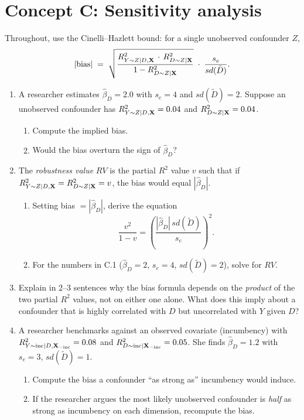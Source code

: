 \documentclass{article}
\begin{document}
\bigskip

\section*{Concept C: Sensitivity analysis}

Throughout, use the Cinelli--Hazlett bound: for a single unobserved confounder $Z$,
$$|\text{bias}| \;=\; \sqrt{\frac{R^2_{Y\sim Z\mid D,{\mathbf X}}\,\cdot\, R^2_{D\sim Z\mid {\mathbf X}}}{1 - R^2_{D\sim Z\mid {\mathbf X}}}}\;\cdot\;\frac{s_e}{sd(\tilde D)}.$$

\begin{enumerate}[label=\textbf{C.\arabic*},leftmargin=*,itemsep=10pt]

\item  A researcher estimates $\hat\beta_D = 2.0$ with $s_e = 4$ and $sd(\tilde D) = 2$.  Suppose an unobserved confounder has $R^2_{Y\sim Z\mid D,{\mathbf X}} = 0.04$ and $R^2_{D\sim Z\mid {\mathbf X}} = 0.04$.
\begin{enumerate}[label=(\alph*)]
  \item Compute the implied bias.
  \item Would the bias overturn the sign of $\hat\beta_D$?
\end{enumerate}

\item  The \emph{robustness value} $RV$ is the partial $R^2$ value $v$ such that if $R^2_{Y\sim Z\mid D,{\mathbf X}} = R^2_{D\sim Z\mid {\mathbf X}} = v$, the bias would equal $|\hat\beta_D|$.
\begin{enumerate}[label=(\alph*)]
  \item Setting bias $= |\hat\beta_D|$, derive the equation
  $$\frac{v^2}{1 - v} = \left(\frac{|\hat\beta_D|\, sd(\tilde D)}{s_e}\right)^2.$$
  \item For the numbers in C.1 ($\hat\beta_D = 2$, $s_e = 4$, $sd(\tilde D) = 2$), solve for $RV$.
\end{enumerate}

\item  Explain in 2--3 sentences why the bias formula depends on the \emph{product} of the two partial $R^2$ values, not on either one alone.  What does this imply about a confounder that is highly correlated with $D$ but uncorrelated with $Y$ given $D$?

\item  A researcher benchmarks against an observed covariate (incumbency) with $R^2_{Y\sim \text{inc}\mid D,{\mathbf X}_{-\text{inc}}} = 0.08$ and $R^2_{D\sim \text{inc}\mid {\mathbf X}_{-\text{inc}}} = 0.05$.  She finds $\hat\beta_D = 1.2$ with $s_e = 3$, $sd(\tilde D) = 1$.
\begin{enumerate}[label=(\alph*)]
  \item Compute the bias a confounder ``as strong as'' incumbency would induce.
  \item If the researcher argues the most likely unobserved confounder is \emph{half} as strong as incumbency on each dimension, recompute the bias.
\end{enumerate}


\end{enumerate}
\end{document}
